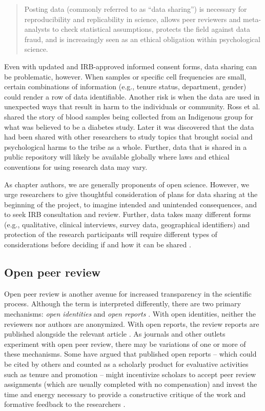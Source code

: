 \documentclass[
  11pt,
]{book}
\begin{document}
\begin{quote}
Posting data (commonly referred to as ``data sharing'') is necessary for reproducibility and replicability in science, allows peer reviewers and meta-analysts to check statistical assumptions, protects the field against data fraud, and is increasingly seen as an ethical obligation within psychological science.
\end{quote}

Even with updated and IRB-approved informed consent forms, data sharing can be problematic, however. When samples or specific cell frequencies are small, certain combinations of information (e.g., tenure status, department, gender) could render a row of data identifiable. Another risk is when the data are used in unexpected ways that result in harm to the individuals or community. Ross et al. \citeyearpar{ross_ethical_2018} shared the story of blood samples being collected from an Indigenous group for what was believed to be a diabetes study. Later it was discovered that the data had been shared with other researchers to study topics that brought social and psychological harms to the tribe as a whole. Further, data that is shared in a public repository will likely be available globally where laws and ethical conventions for using research data may vary.

As chapter authors, we are generally proponents of open science. However, we urge researchers to give thoughtful consideration of plans for data sharing at the beginning of the project, to imagine intended and unintended consequences, and to seek IRB consultation and review. Further, data takes many different forms (e.g., qualitative, clinical interviews, survey data, geographical identifiers) and protection of the research participants will require different types of considerations before deciding if and how it can be shared \citep{ross_ethical_2018}.

\subsection{Open peer review}\label{open-peer-review}

Open peer review is another avenue for increased transparency in the scientific process. Although the term is interpreted differently, there are two primary mechanisms: \emph{open identities} and \emph{open reports} \citep{ross-hellauer_what_2017}. With open identities, neither the reviewers nor authors are anonymized. With open reports, the review reports are published alongside the relevant article \citep{ross-hellauer_what_2017}. As journals and other outlets experiment with open peer review, there may be variations of one or more of these mechanisms. Some have argued that published open reports -- which could be cited by others and counted as a scholarly product for evaluative activities such as tenure and promotion -- might incentivize scholars to accept peer review assignments (which are usually completed with no compensation) and invest the time and energy necessary to provide a constructive critique of the work and formative feedback to the researchers \citep{bezjak_open_2018}.
\end{document}
